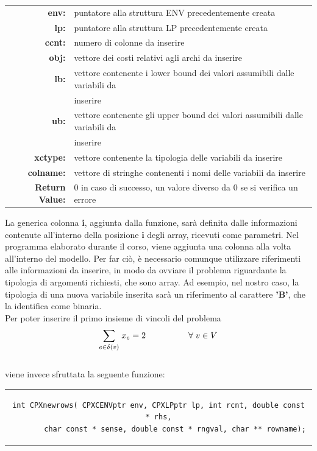 \begin{table}[h]
\begin{tabular}{rl}
\textbf{env:} & {puntatore alla struttura ENV precedentemente creata}\\
\textbf{lp:} & {puntatore alla struttura LP precedentemente creata}\\
\textbf{ccnt:} & {numero di colonne da inserire} \\    
\textbf{obj:} & {vettore dei costi relativi agli archi da inserire} \\
\textbf{lb:} & {vettore contenente i lower bound dei valori assumibili dalle variabili da}\\
&{inserire}\\            
\textbf{ub:} & {vettore contenente gli upper bound dei valori assumibili dalle variabili da}\\
&{inserire}\\
\textbf{xctype:} & {vettore contenente la tipologia delle variabili da inserire}\\
\textbf{colname:} & {vettore di stringhe contenenti i nomi delle variabili da inserire}\\
\textbf{Return Value:} & {0 in caso di successo, un valore diverso da 0 se si verifica un errore}\\
\end{tabular}
\end{table}
La generica colonna \textbf{i}, aggiunta dalla funzione, sarà definita dalle informazioni contenute all'interno della posizione \textbf{i} degli array, ricevuti come parametri. Nel programma elaborato durante il corso, viene aggiunta una colonna alla volta all'interno del modello. Per far ciò, è necessario comunque utilizzare riferimenti alle informazioni da inserire, in modo da ovviare il problema riguardante la tipologia di argomenti richiesti, che sono array. Ad esempio, nel nostro caso, la tipologia di una nuova variabile inserita sarà un riferimento al carattere \textbf{'B'}, che la identifica come binaria.\\
Per poter inserire il primo insieme di vincoli del problema\\
$$
\underset{e\in \delta(v)}\sum{\;x_e} = 2\;\;\;\;\;\;\;\;\;\;\;\;\;\;\;\;\;\;\forall\;v\in V \\\\
$$
\\
viene invece sfruttata la seguente funzione:
\begin{center}
\begin{tabular}{c}
\begin{lstlisting}[linewidth=380pt, basicstyle=\footnotesize\sffamily,]  
int CPXnewrows( CPXCENVptr env, CPXLPptr lp, int rcnt, double const * rhs,
		char const * sense, double const * rngval, char ** rowname);   
\end{lstlisting}
\end{tabular}
\end{center}
